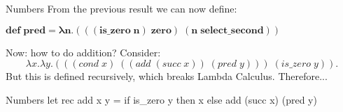 \documentclass{beamer}
\begin{document}
\begin{frame}{Numbers}
From the previous result we can now define:
\begin{framed} $\mathbf{def \; pred = \lambda n . (((is\_zero \; n) \; zero) \; (n \; select\_second))}$ \end{framed}
Now: how to do addition? Consider: $$\lambda x. \lambda y. (((cond \; x) \; ((add \; (succ \; x)) \; (pred \; y))) \; (is\_zero \; y)).$$ But this is defined recursively, which breaks Lambda Calculus. Therefore...
\end{frame}

\begin{frame}{Numbers}
	let rec add x y = if is\_zero y then x
                      else add (succ x) (pred y)
\end{frame}
\end{document}
